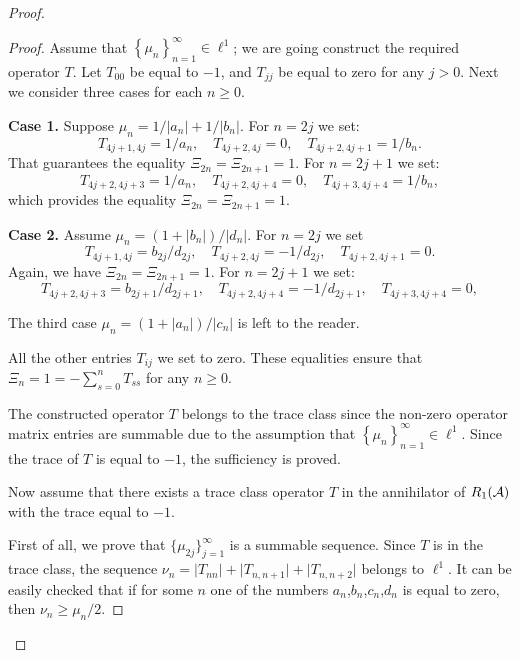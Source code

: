 \begin{proof}
\begin{proof}
        Assume that $\left\{\mu_n\right\}_{n=1}^\infty \in \ell^1$; we are going construct the required operator $T$.
        Let $T_{00}$ be equal to $-1$, and $T_{jj}$ be equal to zero for any $j > 0$.
        Next we consider three cases for each $n \geq 0$.

        \noindent\textbf{Case 1.}
        Suppose $\mu_n = 1/|a_n| + 1/|b_n|$.
        For $n=2j$ we set:
        \[
          T_{4j+1,4j}=1/a_n, \quad T_{4j+2,4j} = 0, \quad T_{4j+2,4j+1}=1/b_n.
        \]
        That guarantees the equality $\Xi_{2n} = \Xi_{2n+1} = 1$.
        For $n=2j+1$ we set:
        \[
          T_{4j+2,4j+3}=1/a_n, \quad T_{4j+2,4j+4} = 0, \quad T_{4j+3,4j+4}=1/b_n,
        \]
        which provides the equality $\Xi_{2n} = \Xi_{2n+1} = 1$.

        \noindent\textbf{Case 2.}
        Assume $\mu_n = (1 + |b_n|)/|d_n|$.
        For $n=2j$ we set
        \[
          T_{4j+1,4j} = b_{2j}/d_{2j}, \quad T_{4j+2,4j} = -1/d_{2j}, \quad T_{4j+2,4j+1} = 0.
        \]
        Again, we have $\Xi_{2n} = \Xi_{2n+1} = 1$.
        For $n = 2j + 1$ we set:
        \[ 
          T_{4j+2,4j+3}=b_{2j+1}/d_{2j+1},  \quad T_{4j+2,4j+4} = -1/d_{2j+1}, \quad T_{4j+3,4j+4}=0,
        \]

        The third case $\mu_n = (1 + |a_n|)/|c_n|$ is left to the reader.
        \medskip

        All the other entries $T_{ij}$ we set to zero.
        These equalities ensure that $\Xi_n = 1 = -\sum_{s=0}^n T_{ss}$ for any $n \geq 0$.

        The constructed operator $T$ belongs to the trace class since the non-zero operator matrix entries are summable
          due to the assumption that $\left\{\mu_n\right\}_{n=1}^\infty \in \ell^1$.
        Since the trace of $T$ is equal to $-1$, the sufficiency is proved.

        Now assume that there exists a trace class operator $T$ in the annihilator of $R_1(\cal{A})$ with the trace equal to $-1$.

        First of all, we prove that $\{\mu_{2j}\}_{j=1}^\infty$ is a summable sequence.
        Since $T$ is in the trace class, the sequence $\nu_n = \lvert T_{nn} \rvert + \lvert T_{n, n + 1} \rvert + \lvert T_{n, n+2} \rvert$
          belongs to $\ell^1$.
        It can be easily checked that if for some $n$ one of the numbers $a_n$,$b_n$,$c_n$,$d_n$ is equal to zero, then $\nu_n \geq \mu_n/2$.


\end{proof}
\end{proof}
